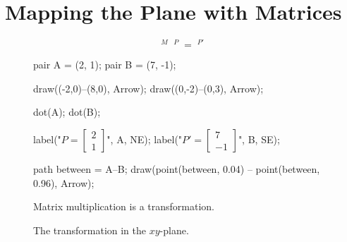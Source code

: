 \documentclass[../gatm.tex]{subfiles}
\begin{document}
\section{Mapping the Plane with Matrices}

\begin{figure}[h]
	\begin{center}
		\begin{minipage}[b]{0.45\textwidth}
			\centering
			$$\mathop{\left[ \begin{array}{cc} 2 & 3 \\ -1 & 1 \end{array}\right]}^{M}
			\mathop{\left[ \begin{array}{c} 2 \\ 1 \end{array}\right]}^{P} = \mathop{\left[ \begin{array}{c} 7 \\ -1 \end{array} \right]}^{P'}$$
			\vspace*{0.5\baselineskip}
		\end{minipage}
		\hfill
		\begin{minipage}[b]{0.45\textwidth}
			\centering
			\begin{asy}[width=0.7\textwidth]
				pair A = (2, 1);
				pair B = (7, -1);
				
				draw((-2,0)--(8,0), Arrow);
				draw((0,-2)--(0,3), Arrow);
				
				dot(A);
				dot(B);
				
				label("$P=\left[ \begin{array}{c} 2 \\ 1 \end{array}\right]$", A, NE);
				label("$P'=\left[ \begin{array}{c} 7 \\ -1 \end{array} \right]$", B, SE);
				
				path between = A--B;
				draw(point(between, 0.04) -- point(between, 0.96), Arrow);
			\end{asy}
		\end{minipage}
	\end{center}
	\vspace*{-2\baselineskip}
	\begin{center}
		\begin{minipage}[t]{0.45\textwidth}
			\caption{Matrix multiplication is a transformation.}
			\label{fig:random_matrix}
		\end{minipage}
		\hfill
		\begin{minipage}[t]{0.45\textwidth}
			\caption{The transformation in the $xy$-plane.}
			\label{fig:geo_interp}
		\end{minipage}
	\end{center}
\end{figure}
\end{document}
